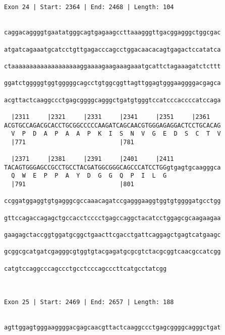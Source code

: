 \documentclass{article}
\begin{document}
\begin{Verbatim}
                                        
 
Exon 24 | Start: 2364 | End: 2468 | Length: 104


caggacaggggtgaatatgggcagtgagaagccttaaagggttgacggagggctggcgac
                                                            
atgatcagaaatgcatcctgttgagacccagcctggacaacacagtgagactccatatca
                                                            
ctaaaaaaaaaaaaaaaaaaaggaaaagaagaaagaaatgcattctagaaagatctcttt
                                                            
ggatctgggggtggtgggggcagcctgtggcggttagttggagtgggaaggggacgagca
                                                            
acgttactcaaggccctgagcggggcagggctgatgtgggtccatcccaccccatccaga
                                                            
  |2311     |2321     |2331     |2341     |2351     |2361   
ACGTGCCAGACGCACCTGCGGCCCCCAAGATCAGCAACGTGGGAGAGGACTCCTGCACAG
  V  P  D  A  P  A  A  P  K  I  S  N  V  G  E  D  S  C  T  V
  |771                          |781                        
  
  |2371     |2381     |2391     |2401     |2411             
TACAGTGGGAGCCGCCTGCCTACGATGGCGGGCAGCCCATCCTGGgtgagtgcaagggca
  Q  W  E  P  P  A  Y  D  G  G  Q  P  I  L  G               
  |791                          |801                        
  
ccggatggaggtgtgagggcgccaaacagatccgagggaaggtggtgtggggatgcctgg
                                                            
gttccagaccagagctgccacctcccctgagccaggctacatcctggagcgcaagaagaa
                                                            
gaagagctaccggtggatgcggctgaacttcgacctgattcaggagctgagtcatgaagc
                                                            
gcggcgcatgatcgagggcgtggtgtacgagatgcgcgtctacgcggtcaacgccatcgg
                                                            
catgtccaggcccagccctgcctcccagcccttcatgcctatcgg
                                             
                                             
 
Exon 25 | Start: 2469 | End: 2657 | Length: 188


agttggagtgggaaggggacgagcaacgttactcaaggccctgagcggggcagggctgat
                                                            

\end{Verbatim}
\end{document}
